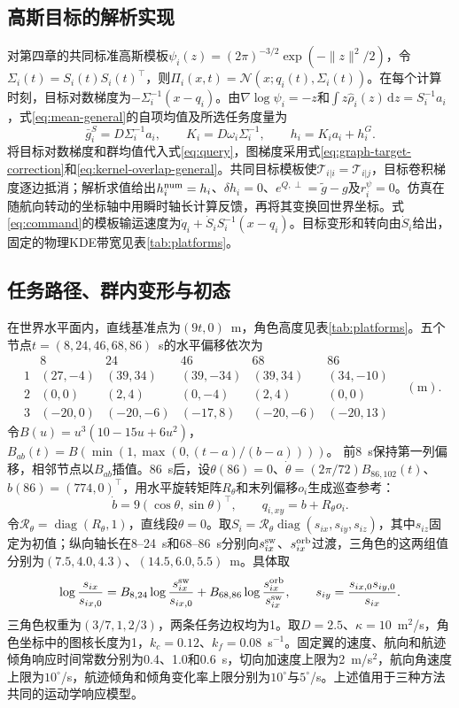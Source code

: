 \documentclass[UTF8,a4paper,11pt,fontset=none]{ctexart}
\newcommand{\diag}{\operatorname{diag}}\newcommand{\col}{\operatorname{col}}
\begin{document}
\subsection{高斯目标的解析实现}\label{app:gaussian-implementation}
对第四章的共同标准高斯模板$\psi_i(z)=(2\pi)^{-3/2}\exp(-\|z\|^2/2)$，令$\Sigma_i(t)=S_i(t)S_i(t)^\top$，则$\Pi_i(x,t)=\mathcal N(x;q_i(t),\Sigma_i(t))$。在每个计算时刻，目标对数梯度为$-\Sigma_i^{-1}(x-q_i)$。由$\nabla\log\psi_i=-z$和$\int z\widehat\rho_i(z)\,\mathrm dz=S_i^{-1}a_i$，式\eqref{eq:mean-general}的自项均值及所选任务度量为
\begin{equation}
\bar g_i^S=D\Sigma_i^{-1}a_i,\qquad
K_i=D\omega_i\Sigma_i^{-1},\qquad h_i=K_i a_i+h_i^G .
\label{eq:exact-mean}
\end{equation}
将目标对数梯度和群均值代入式\eqref{eq:query}，图梯度采用式\eqref{eq:graph-target-correction}和\eqref{eq:kernel-overlap-general}。共同目标模板使$\mathcal T_{i|i}=\mathcal T_{i|j}$，目标卷积梯度逐边抵消；解析求值给出$h_i^{\rm num}=h_i$、$\delta h_i=0$、$e^{Q,\perp}=\widetilde g-g$及$r_i^\psi=0$。仿真在随航向转动的坐标轴中用瞬时轴长计算反馈，再将其变换回世界坐标。式\eqref{eq:command}的模板输运速度为$\dot q_i+\dot S_i S_i^{-1}(x-q_i)$。目标变形和转向由$\dot S_i$给出，固定的物理KDE带宽见表\ref{tab:platforms}。

\subsection{任务路径、群内变形与初态}
在世界水平面内，直线基准点为$(9t,0)$~m，角色高度见表\ref{tab:platforms}。五个节点$t=(8,24,46,68,86)$~s的水平偏移依次为
\[
\begin{array}{c|ccccc}
 &8&24&46&68&86\\ \hline
1&(27,-4)&(39,34)&(39,-34)&(39,34)&(34,-10)\\
2&(0,0)&(2,4)&(0,-4)&(2,4)&(0,0)\\
3&(-20,0)&(-20,-6)&(-17,8)&(-20,-6)&(-20,13)
\end{array}\quad(\mathrm m).
\]
令$B(u)=u^3(10-15u+6u^2)$，$B_{ab}(t)=B(\min(1,\max(0,(t-a)/(b-a))))$。
前8~s保持第一列偏移，相邻节点以$B_{ab}$插值。86~s后，设$\theta(86)=0$、$\dot\theta=(2\pi/72)B_{86,102}(t)$、$b(86)=(774,0)^\top$，用水平旋转矩阵$R_\theta$和末列偏移$o_i$生成巡查参考：
\begin{equation}
 \dot b=9(\cos\theta,\sin\theta)^\top,\qquad q_{i,xy}=b+R_\theta o_i .
 \label{eq:engineering-reference}
\end{equation}
令$\mathcal R_\theta=\diag(R_\theta,1)$，直线段$\theta=0$。取$S_i=\mathcal R_\theta\diag(s_{ix},s_{iy},s_{iz})$，其中$s_{iz}$固定为初值；纵向轴长在8--24~s和68--86~s分别向$s_{ix}^{\rm sw}$、$s_{ix}^{\rm orb}$过渡，三角色的这两组值分别为$(7.5,4.0,4.3)$、$(14.5,6.0,5.5)$~m。具体取
\[
 \log\frac{s_{ix}}{s_{ix,0}}
 =B_{8,24}\log\frac{s_{ix}^{\rm sw}}{s_{ix,0}}
 +B_{68,86}\log\frac{s_{ix}^{\rm orb}}{s_{ix}^{\rm sw}},\qquad
 s_{iy}=\frac{s_{ix,0}s_{iy,0}}{s_{ix}} .
\]
三角色权重为$(3/7,1,2/3)$，两条任务边权均为1。取$D=2.5$、$\kappa=10$~m$^2$/s，角色坐标中的图核长度为1，$k_c=0.12$、$k_f=0.08$~s$^{-1}$。固定翼的速度、航向和航迹倾角响应时间常数分别为0.4、1.0和0.6~s，切向加速度上限为2~m/s$^2$，航向角速度上限为$10^\circ$/s，航迹倾角和倾角变化率上限分别为$10^\circ$与$5^\circ$/s。上述值用于三种方法共同的运动学响应模型。
\end{document}
